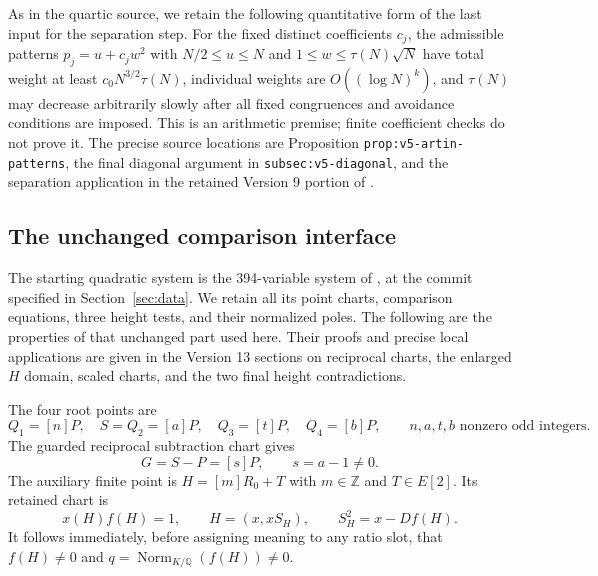 \documentclass[11pt,a4paper]{article}
\theoremstyle{definition}\newtheorem{definition}[theorem]{Definition}
\theoremstyle{remark}\newtheorem{remark}[theorem]{Remark}
\newcommand{\Q}{\mathbb Q}\newcommand{\Z}{\mathbb Z}
\DeclareMathOperator{\Norm}{Norm}
\begin{document}
As in the quartic source, we retain the following quantitative form of the
last input for the separation step. For the fixed distinct coefficients
$c_j$, the admissible patterns $p_j=u+c_jw^2$ with
$N/2\le u\le N$ and $1\le w\le\tau(N)\sqrt N$ have total weight at least
$c_0N^{3/2}\tau(N)$, individual weights are
$O((\log N)^k)$, and $\tau(N)$ may decrease arbitrarily slowly after
all fixed congruences and avoidance conditions are imposed. This is an
arithmetic premise; finite coefficient checks do not prove it. The precise
source locations are Proposition \nolinkurl{prop:v5-artin-patterns}, the
final diagonal argument in \nolinkurl{subsec:v5-diagonal}, and the
separation application in the retained Version 9 portion of
\cite{GlazerV13}.

\subsection{The unchanged comparison interface}
The starting quadratic system is the 394-variable system of
\cite{GlazerV13}, at the commit specified in Section~\ref{sec:data}.
We retain all its point charts, comparison equations, three height tests,
and their normalized poles. The following are the properties of that
unchanged part used here. Their proofs and precise local applications
are given in the Version 13 sections on reciprocal charts, the enlarged
$H$ domain, scaled charts, and the two final height contradictions.

The four root points are
\[
 Q_1=[n]P,\quad S=Q_2=[a]P,\quad Q_3=[t]P,\quad Q_4=[b]P,
 \qquad n,a,t,b\text{ nonzero odd integers}.
\]
The guarded reciprocal subtraction chart gives
\[
 G=S-P=[s]P,\qquad s=a-1\ne0.
\]
The auxiliary finite point is $H=[m]R_0+T$ with $m\in\Z$ and
$T\in E[2]$. Its retained chart is
\[
 x(H)f(H)=1,\qquad H=(x,xS_H),\qquad S_H^2=x-Df(H).
\]
It follows immediately, before assigning meaning to any ratio slot, that
$f(H)\ne0$ and $q=\Norm_{K/\Q}(f(H))\ne0$.
\end{document}
